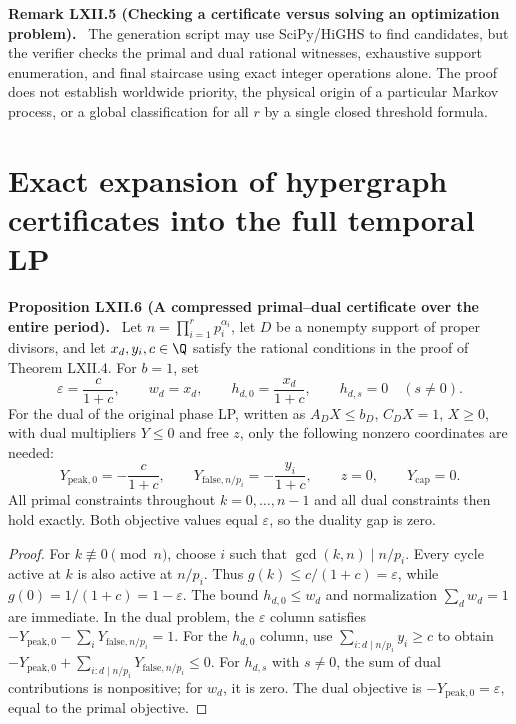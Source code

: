 \documentclass[11pt,a4paper,oneside]{book}
\newcommand{\statement}[3]{\par\medskip\noindent\textbf{#1 #2 (#3).}\ }
\begin{document}
\statement{Remark}{LXII.5}{Checking a certificate versus solving an optimization problem}
The generation script may use SciPy/HiGHS to find candidates, but the verifier checks the primal and dual rational witnesses, exhaustive support enumeration, and final staircase using exact integer operations alone. The proof does not establish worldwide priority, the physical origin of a particular Markov process, or a global classification for all $r$ by a single closed threshold formula.

\section{Exact expansion of hypergraph certificates into the full temporal LP}
\statement{Proposition}{LXII.6}{A compressed primal--dual certificate over the entire period}
Let $n=\prod_{i=1}^rp_i^{\alpha_i}$, let $D$ be a nonempty support of proper divisors, and let $x_d,y_i,c\in\Q$ satisfy the rational conditions in the proof of Theorem LXII.4. For $b=1$, set
\begin{equation}
\varepsilon=\frac c{1+c},\qquad w_d=x_d,\qquad h_{d,0}=\frac{x_d}{1+c},\qquad h_{d,s}=0\quad(s\ne0).\tag{398}
\end{equation}
For the dual of the original phase LP, written as $A_DX\le b_D$, $C_DX=1$, $X\ge0$, with dual multipliers $Y\le0$ and free $z$, only the following nonzero coordinates are needed:
\begin{equation}
Y_{\mathrm{peak},0}=-\frac c{1+c},\qquad
Y_{\mathrm{false},n/p_i}=-\frac{y_i}{1+c},\qquad z=0,\qquad Y_{\mathrm{cap}}=0.\tag{399}
\end{equation}
All primal constraints throughout $k=0,\ldots,n-1$ and all dual constraints then hold exactly. Both objective values equal $\varepsilon$, so the duality gap is zero.
\begin{proof}
For $k\not\equiv0\pmod n$, choose $i$ such that $\gcd(k,n)\mid n/p_i$. Every cycle active at $k$ is also active at $n/p_i$. Thus $g(k)\le c/(1+c)=\varepsilon$, while $g(0)=1/(1+c)=1-\varepsilon$. The bound $h_{d,0}\le w_d$ and normalization $\sum_dw_d=1$ are immediate. In the dual problem, the $\varepsilon$ column satisfies $-Y_{\mathrm{peak},0}-\sum_iY_{\mathrm{false},n/p_i}=1$. For the $h_{d,0}$ column, use $\sum_{i:d\mid n/p_i}y_i\ge c$ to obtain $-Y_{\mathrm{peak},0}+\sum_{i:d\mid n/p_i}Y_{\mathrm{false},n/p_i}\le0$. For $h_{d,s}$ with $s\ne0$, the sum of dual contributions is nonpositive; for $w_d$, it is zero. The dual objective is $-Y_{\mathrm{peak},0}=\varepsilon$, equal to the primal objective.
\end{proof}
\end{document}
